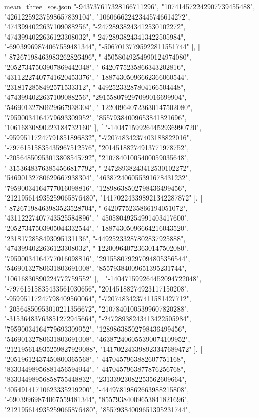 \begin{filecontents*}[overwrite]{mean_three_sos.json}
    "-943737617328166711296",
    "107414572242907739455488",
    "42612259237598657839104",
    "106066622423445746614272",
    "4743994022637109088256",
    "-24728938243412530102272",
    "4743994022636123308032",
    "-24728938243413422505984",
    "-69039969874067559481344",
    "-50670137795922811551744"
   ],
   [
    "-87267198463983262826496",
    "-45058049254990124974080",
    "20527347503907869442048",
    "-6420775235866343202816",
    "43112227407741620453376",
    "-18874305096662366060544",
    "2318172858492571533312",
    "-44925233287804166504448",
    "4743994022637109088256",
    "291558079297099016699904",
    "54690132780629667938304",
    "-122009640723630147502080",
    "79590034164779693309952",
    "85579384009653841821696",
    "10616830890223184732160"
   ],
   [
    "-140471599264452936990720",
    "-95995117247791851896832",
    "-72074834237403188822016",
    "-79761515835435967512576",
    "20145188274913771978752",
    "-20564850953013808545792",
    "21078401005400059035648",
    "-31536483763854566817792",
    "-24728938243412530102272",
    "54690132780629667938304",
    "463872406055391678431232",
    "79590034164777016098816",
    "12898638502798436499456",
    "212195614935259065876480",
    "141702243398921342287872"
   ],
   [
    "-87267198463983523528704",
    "-6420775235866194051072",
    "43112227407743525584896",
    "-45058049254991403417600",
    "20527347503905044332544",
    "-18874305096664216043520",
    "2318172858493095131136",
    "-44925233287802837925888",
    "4743994022636123308032",
    "-122009640723630147502080",
    "79590034164777016098816",
    "291558079297094805356544",
    "54690132780631803691008",
    "85579384009651395231744",
    "10616830890224772759552"
   ],
   [
    "-140471599264452094722048",
    "-79761515835433561030656",
    "20145188274923117150208",
    "-95995117247798409560064",
    "-72074834237411581427712",
    "-20564850953010211356672",
    "21078401005399607820288",
    "-31536483763851272945664",
    "-24728938243413422505984",
    "79590034164779693309952",
    "12898638502798436499456",
    "54690132780631803691008",
    "463872406055390074109952",
    "212195614935259827929088",
    "141702243398923347689472"
   ],
   [
    "20519612437450800365568",
    "-4470457963882607751168",
    "83304498956881456594944",
    "-4470457963877876256768",
    "83304498956858755448832",
    "23133923082253562609664",
    "40549141710623335219200",
    "-44497819862663988215808",
    "-69039969874067559481344",
    "85579384009653841821696",
    "212195614935259065876480",
    "85579384009651395231744",

\end{filecontents*}
